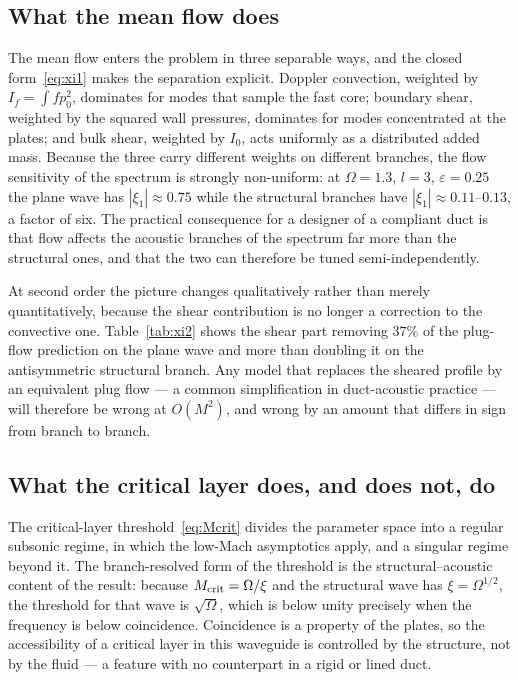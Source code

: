 \documentclass[11pt,a4paper]{article}
\newcommand{\Om}{\Omega}
\newcommand{\eps}{\varepsilon}
\theoremstyle{plain}
\theoremstyle{remark}
\begin{document}
\subsection{What the mean flow does}
The mean flow enters the problem in three separable ways, and the closed form~\eqref{eq:xi1} makes the
separation explicit. Doppler convection, weighted by $I_f=\int fp_0^2$, dominates for modes that
sample the fast core; boundary shear, weighted by the squared wall pressures, dominates for modes
concentrated at the plates; and bulk shear, weighted by $I_0$, acts uniformly as a distributed added
mass. Because the three carry different weights on different branches, the flow sensitivity of the
spectrum is strongly non-uniform: at $\Om=1.3$, $l=3$, $\eps=0.25$ the plane wave has
$|\xi_1|\approx0.75$ while the structural branches have $|\xi_1|\approx0.11$--$0.13$, a factor of six.
The practical consequence for a designer of a compliant duct is that flow affects the acoustic branches
of the spectrum far more than the structural ones, and that the two can therefore be tuned
semi-independently.

At second order the picture changes qualitatively rather than merely quantitatively, because the shear
contribution is no longer a correction to the convective one. Table~\ref{tab:xi2} shows the shear part
removing $37\%$ of the plug-flow prediction on the plane wave and more than doubling it on the
antisymmetric structural branch. Any model that replaces the sheared profile by an equivalent plug flow
--- a common simplification in duct-acoustic practice --- will therefore be wrong at $O(M^2)$, and wrong
by an amount that differs in sign from branch to branch.

\subsection{What the critical layer does, and does not, do}
The critical-layer threshold~\eqref{eq:Mcrit} divides the parameter space into a regular subsonic
regime, in which the low-Mach asymptotics apply, and a singular regime beyond it. The branch-resolved
form of the threshold is the structural--acoustic content of the result: because $M_{\rm crit}=\Om/\xi$
and the structural wave has $\xi=\Om^{1/2}$, the threshold for that wave is $\sqrt\Om$, which is below
unity precisely when the frequency is below coincidence. Coincidence is a property of the plates, so
the accessibility of a critical layer in this waveguide is controlled by the structure, not by the
fluid --- a feature with no counterpart in a rigid or lined duct.
\end{document}
